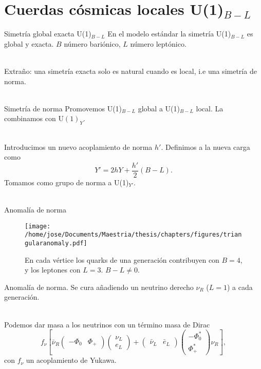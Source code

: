 \documentclass[14pt]{beamer}
\begin{document}
\section{Cuerdas cósmicas locales U(1)$_{B-L}$}
\begin{frame}{Simetría global exacta U(1)$_{B-L}$}
En el modelo estándar la simetría U(1)$_{B-L}$ es global y exacta. $B$ número bariónico, $L$ número leptónico.\\~\

Extraño: una simetría exacta solo es natural cuando es local, i.e una simetría de norma. \\~\
\end{frame}

\begin{frame}{Simetría de norma}
Promovemos U(1)$_{B-L}$ global a U(1)$_{B-L}$ local. La combinamos con U$(1)_Y$. \\~\

Introducimos un nuevo acoplamiento de norma $h'$. Definimos a la nueva carga como
	$$Y' = 2hY + \frac{h'}{2}(B-L).$$
Tomamos como grupo de norma a U(1)$_{Y'}$.\\~\
\end{frame}


\begin{frame}{Anomalía de norma}
\begin{figure}
\texttt{[image: /home/jose/Documents/Maestria/thesis/chapters/figures/triangularanomaly.pdf]}

\caption{En cada vértice  los quarks de una generación contribuyen con $B=4$, y los leptones con $L=3$. $B-L\neq 0$.}
\end{figure}
\centering

\end{frame}

\begin{frame}%

Anomalía de norma. Se cura añadiendo un neutrino derecho $\nu_R$ ($L=1$) a cada generación. \\~\

Podemos dar masa a los neutrinos con un término masa de Dirac
$$ f_{\nu} \left[\bar{\nu}_R \begin{pmatrix}-\Phi_0 & \Phi_+\end{pmatrix}\begin{pmatrix}
	\nu_L \\
	e_L
\end{pmatrix} + \begin{pmatrix}\bar{\nu}_L & \bar{e}_L\end{pmatrix}
\begin{pmatrix}
	-\Phi^*_0 \\
	\Phi^*_+
\end{pmatrix}\nu_R\right], $$
con $f_{\nu}$ un acoplamiento de Yukawa.

\end{frame}
\end{document}
